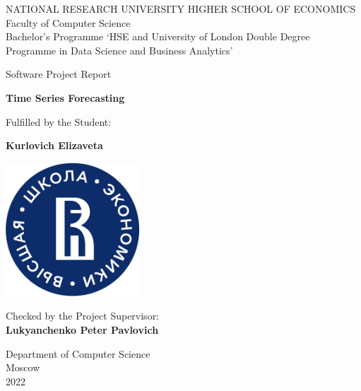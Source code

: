 \begin{titlepage}
    \begin{center}
        \vspace*{1cm}
        \huge
        \MakeUppercase{National research university Higher School of Economics}\\
        \vspace{0.8cm}
        \Large
        Faculty of Computer Science\\
        \vspace{0.8cm}
        Bachelor’s Programme ‘HSE and University of London Double Degree Programme in Data Science and Business Analytics’
         
        \vspace{1cm}

         \vspace{0.5cm}
        \LARGE
        Software Project Report
            
        \Huge
        \textbf{Time Series Forecasting}
      
        \vspace{0.5cm}
        \LARGE
        Fulfilled by the Student:
    
        \Huge
        \textbf{Kurlovich Elizaveta}\\
        \vspace{1cm}

        \includegraphics[width=5cm, height=5cm]{images/logo.png}
        
       
       \vfill
       
       \LARGE   
        Checked by the Project Supervisor:\\
        \Huge
        \textbf{Lukyanchenko Peter Pavlovich}
            
        \vspace{0.8cm}
                    
        \Large
        Department of Computer Science\\
        Moscow\\
        2022


            
    \end{center}
\end{titlepage}